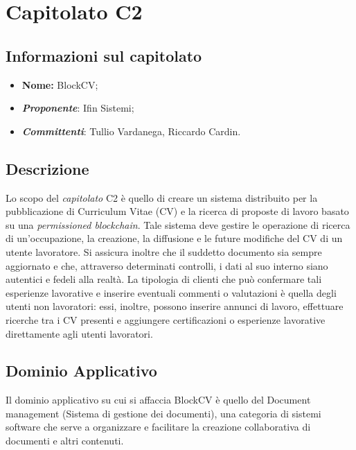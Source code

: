 \section{Capitolato C2}
\subsection{Informazioni sul capitolato}
	\begin{itemize}
		\item \textbf{Nome:}
		BlockCV;
		\item \textbf{\textit{Proponente}}:
		Ifin Sistemi;
		\item \textbf{\textit{Committenti}}:
		Tullio Vardanega, Riccardo Cardin.
	\end{itemize}

\subsection{Descrizione}
	Lo scopo del \textit{capitolato} C2 è quello di creare un sistema distribuito per la pubblicazione di Curriculum Vitae (CV) e la ricerca di proposte di lavoro basato su una \textit{permissioned blockchain}. Tale sistema deve gestire le operazione di ricerca di un'occupazione, la creazione, la diffusione e le future modifiche del CV di un utente lavoratore. Si assicura inoltre che il suddetto documento sia sempre aggiornato e che, attraverso determinati controlli, i dati al suo interno siano autentici e fedeli alla realtà.
	\newline \newline La tipologia di clienti che può confermare tali esperienze lavorative e inserire eventuali commenti o valutazioni è quella degli utenti non lavoratori: essi, inoltre, possono inserire annunci di lavoro, effettuare ricerche tra i CV presenti e aggiungere certificazioni o esperienze lavorative direttamente agli utenti lavoratori.

\subsection{Dominio Applicativo}
	Il dominio applicativo su cui si affaccia BlockCV è quello del Document management (Sistema di gestione dei documenti), una categoria di sistemi software che serve a organizzare e facilitare la creazione collaborativa di documenti e altri contenuti.

